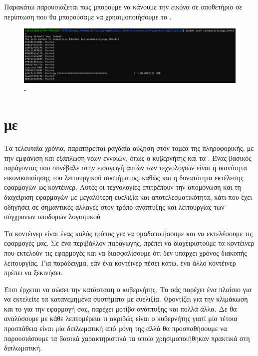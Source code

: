 \FloatBarrier

\FloatBarrier

Παρακάτω παρουσιάζεται πως μπορούμε να κάνουμε  την εικόνα
σε αποθετήριο σε περίπτωση που θα μπορούσαμε να χρησιμοποιήσουμε το 
.

\begin{figure}[h]
	\centering
	\includegraphics[width=1.5\textwidth]{graphics/dockerpush.png}
	\caption{-}
\end{figure}



\section{ με }

Τα τελευταία χρόνια, παρατηρείται ραγδαία αύξηση στον τομέα της πληροφορικής, 
με την εμφάνιση και εξάπλωση νέων εννοιών, όπως ο κυβερνήτης και τα . 
Ένας βασικός παράγοντας που συνέβαλε στην εισαγωγή αυτών των τεχνολογιών είναι η ικανότητα εικονικοποίησης 
του λειτουργικού συστήματος, καθώς και η δυνατότητα εκτέλεσης εφαρμογών ως κοντέινερ. 
Αυτές οι τεχνολογίες επιτρέπουν την απομόνωση και τη διαχείριση εφαρμογών με μεγαλύτερη ευελιξία και 
αποτελεσματικότητα, κάτι που έχει οδηγήσει σε σημαντικές αλλαγές στον τρόπο ανάπτυξης και λειτουργίας των σύγχρονων υποδομών λογισμικού

Τα κοντέινερ είναι ένας καλός τρόπος για να ομαδοποιήσουμε και να εκτελέσουμε τις εφαρμογές μας. 
Σε ένα περιβάλλον παραγωγής, πρέπει να διαχειριστούμε τα κοντέινερ που εκτελούν τις εφαρμογές και να 
διασφαλίσουμε ότι δεν υπάρχει χρόνος διακοπής λειτουργίας. Για παράδειγμα, εάν ένα κοντέινερ πέσει κάτω, ένα άλλο κοντέινερ πρέπει να ξεκινήσει. 

Έτσι έρχεται να σώσει την κατάσταση ο κυβερνήτης. Το  σάς παρέχει ένα πλαίσιο για να εκτελείτε τα κατανεμημένα συστήματα με ευελιξία. 
Φροντίζει για την κλιμάκωση και το  για την εφαρμογή σας, παρέχει μοτίβα ανάπτυξης και πολλά άλλα. Δε θα αναλύσουμε με κάθε λεπτομέρεια
τι ακριβώς είναι ο κυβερνήτης γιατί μία τέτοια προσπάθεια είναι μία διπλωματική από μόνη της αλλά θα προσπαθήσουμε να παρουσιάσουμε τα βασικά χαρακτηριστικά τα οποία
χρησιμοποιήθηκαν πρακτικά στη διπλωματική.



